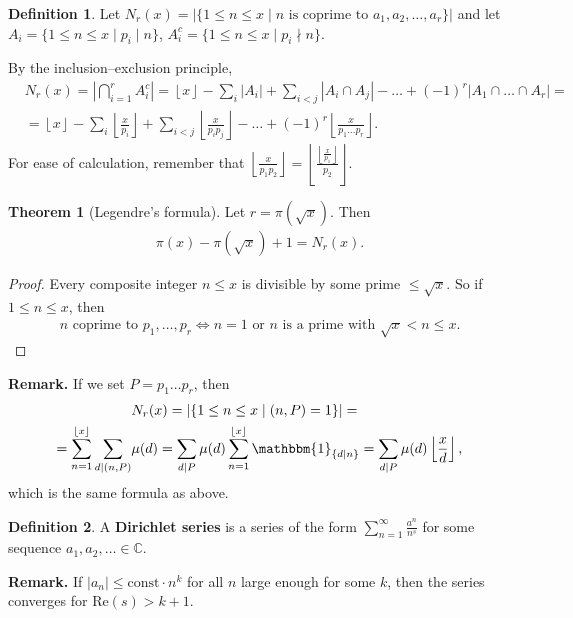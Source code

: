 \documentclass{article}
\theoremstyle{definition}
\newtheorem{theorem}{Theorem}[section]
\newtheorem{defn}{Definition}[section]
\begin{document}
\begin{defn}
   Let $N_r(x) = |\{1\le n\le x \mid n \text{ is coprime to }a_1,a_2,\ldots,a_r\}|$ and let $A_i = \{1\le n\le x \mid p_i \mid n\}$, $A_i^c = \{1\le n\le x \mid p_i \nmid n \}$.
\end{defn}
By the inclusion--exclusion principle,
\begin{align*}
    &N_r(x)=|\bigcap_{i=1}^r A_i^c| = \left\lfloor x \right\rfloor - \sum_{i}^{} |A_i| + \sum_{i<j}^{} |A_i \cap A_j| - \ldots +(-1)^r |A_1 \cap \ldots \cap A_r| = \\
    &=\left\lfloor x \right\rfloor - \sum_{i}^{} \left\lfloor \frac{x}{p_i} \right\rfloor + \sum_{i<j}^{} \left\lfloor \frac{x}{p_ip_j}  \right\rfloor-\ldots + (-1)^r \left\lfloor \frac{x}{p_1\ldots p_r} \right\rfloor.
\end{align*}
For ease of calculation, remember that $\left\lfloor \frac{x}{p_1p_2} \right\rfloor=\left\lfloor \frac{\left\lfloor \frac{x}{p_1} \right\rfloor}{p_2} \right\rfloor.$   

\begin{theorem}[Legendre's formula]
    Let $r=\pi(\sqrt{x})$. Then 
    \begin{align*}
        \pi(x) - \pi(\sqrt{x}) + 1 = N_r(x).
    \end{align*}
\end{theorem}
\begin{proof}
    Every composite integer $n\le x$ is divisible by some prime $\le \sqrt{x}$. So if $1\le n\le x$, then
    \begin{align*}
        n \text{ coprime to } p_1,\ldots,p_r \iff n=1 \text{ or }n \text{ is a prime with } \sqrt{x}<n\le x.
    \end{align*}
\end{proof}
\textbf{Remark.} If we set $P=p_1\ldots p_r$, then 
\begin{align*}
    &N_r(x) = |\{1\le n\le x \mid (n,P)=1\}| =\\
    =\sum_{n=1}^{\left\lfloor x \right\rfloor} \sum_{d \mid (n,P)}^{} &\mu(d) = \sum_{d \mid P}^{} \mu(d) \sum_{n=1}^{\left\lfloor x \right\rfloor} \mathbbm{1}_{\{d \mid n\}} = \sum_{d \mid P}^{} \mu(d) \left\lfloor \frac{x}{d} \right\rfloor, 
\end{align*}
which is the same formula as above.

\begin{defn}
    A \textbf{Dirichlet series} is a series of the form $\sum_{n=1}^{\infty} \frac{a^n}{n^s}$ for some sequence $a_1,a_2,\ldots \in \mathbb{C}$. 
\end{defn}
\textbf{Remark.} If $|a_n|\le \text{const}\cdot n^k$ for all $n$ large enough for some $k$, then the series converges for $\text{Re}(s)>k+1$.
\end{document}
